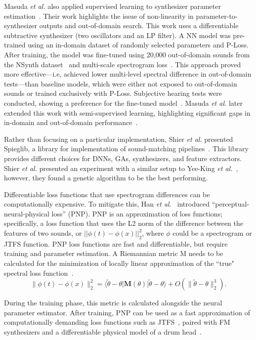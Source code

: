 \documentclass[lettersize,journal]{IEEEtran}
\begin{document}
Masuda \textit{et al.} also applied supervised learning to synthesizer parameter estimation~\cite{masuda2021soundmatch}. Their work highlights the issue of non-linearity in parameter-to-synthesizer outputs and out-of-domain search. This work uses a differentiable subtractive synthesizer (two oscillators and an LP filter). A NN model was pre-trained using an in-domain dataset of randomly selected parameters and P-Loss. After training, the model was fine-tuned using 20,000 out-of-domain sounds from the NSynth dataset~\cite{engel2017neural} and multi-scale spectrogram loss~\cite{engel2020ddsp}. This approach proved more effective---i.e, achieved lower multi-level spectral difference in out-of-domain tests---than baseline models, which were either not exposed to out-of-domain sounds or trained exclusively with P-Loss. Subjective hearing tests were conducted, showing a preference for the fine-tuned model~\cite{masuda2021soundmatch}. Masuda \textit{et al.} later extended this work with semi-supervised learning, highlighting significant gaps in in-domain and out-of-domain performance~\cite{masuda2023improving}.

Rather than focusing on a particular implementation, Shier \textit{et al.} presented Spieglib, a library for implementation of sound-matching pipelines~\cite{shier2020spiegelib}. This library provides different choices for DNNs, GAs, synthesizers, and feature extractors. Shier \textit{et al.} presented an experiment with a similar setup to Yee-King \textit{et al.}~\cite{yee2018automatic}, however, they found a genetic algorithm to be the best performing.

Differentiable loss functions that use spectrogram differences can be computationally expensive. To mitigate this, Han \textit{et al.}~\cite{han2023perceptual} introduced ``perceptual-neural-physical loss'' (PNP). PNP is an approximation of loss functions; specifically, a loss function that uses the L2 norm of the difference between the features of two sounds, or $||\phi(t) - \phi(x)||^2_2$, where $\phi$ could be a spectrogram or JTFS function. PNP loss functions are fast and differentiable, but require training and parameter estimation. A Riemannian metric M needs to be calculated for the minimization of locally linear approximation of the ``true" spectral loss function~\cite{han2023perceptual}. 
\[
\|\phi(t) - \phi(x)\|_2^2 = \langle \tilde{\theta} - \theta | \mathbf{M}(\theta) | \tilde{\theta} - \theta \rangle + O(\|\tilde{\theta} - \theta\|_2^3). \tag{4}
\]

During the training phase, this metric is calculated alongside the neural parameter estimator. After training, PNP can be used as a fast approximation of computationally demanding loss functions such as JTFS~\cite{han2023perceptual,han2024learning}, paired with FM synthesizers and a differentiable physical model of a drum head~\cite{smith2010physical}.
\end{document}
